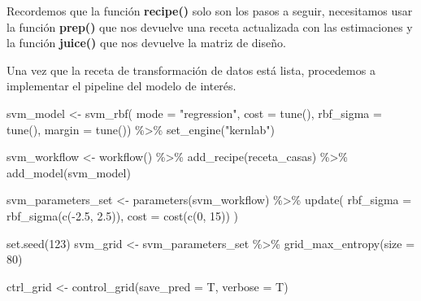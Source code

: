\documentclass[
]{book}
\newenvironment{Shaded}{\begin{snugshade}}{\end{snugshade}}
\newcommand{\AttributeTok}[1]{\textcolor[rgb]{0.77,0.63,0.00}{#1}}
\newcommand{\DecValTok}[1]{\textcolor[rgb]{0.00,0.00,0.81}{#1}}
\newcommand{\FloatTok}[1]{\textcolor[rgb]{0.00,0.00,0.81}{#1}}
\newcommand{\FunctionTok}[1]{\textcolor[rgb]{0.00,0.00,0.00}{#1}}
\newcommand{\NormalTok}[1]{#1}
\newcommand{\OtherTok}[1]{\textcolor[rgb]{0.56,0.35,0.01}{#1}}
\newcommand{\SpecialCharTok}[1]{\textcolor[rgb]{0.00,0.00,0.00}{#1}}
\newcommand{\StringTok}[1]{\textcolor[rgb]{0.31,0.60,0.02}{#1}}
\begin{document}
Recordemos que la función \textbf{recipe()} solo son los pasos a seguir, necesitamos usar la función \textbf{prep()} que nos devuelve una receta actualizada con las estimaciones y la función \textbf{juice()} que nos devuelve la matriz de diseño.

Una vez que la receta de transformación de datos está lista, procedemos a implementar el pipeline del modelo de interés.

\begin{Shaded}
\begin{Highlighting}[]
\NormalTok{svm\_model }\OtherTok{\textless{}{-}} \FunctionTok{svm\_rbf}\NormalTok{(}
  \AttributeTok{mode =} \StringTok{"regression"}\NormalTok{,}
  \AttributeTok{cost =} \FunctionTok{tune}\NormalTok{(),}
  \AttributeTok{rbf\_sigma =} \FunctionTok{tune}\NormalTok{(),}
  \AttributeTok{margin =} \FunctionTok{tune}\NormalTok{()) }\SpecialCharTok{\%\textgreater{}\%} 
\FunctionTok{set\_engine}\NormalTok{(}\StringTok{"kernlab"}\NormalTok{)}

\NormalTok{svm\_workflow }\OtherTok{\textless{}{-}} \FunctionTok{workflow}\NormalTok{() }\SpecialCharTok{\%\textgreater{}\%} 
  \FunctionTok{add\_recipe}\NormalTok{(receta\_casas) }\SpecialCharTok{\%\textgreater{}\%} 
  \FunctionTok{add\_model}\NormalTok{(svm\_model)}

\NormalTok{svm\_parameters\_set }\OtherTok{\textless{}{-}} \FunctionTok{parameters}\NormalTok{(svm\_workflow) }\SpecialCharTok{\%\textgreater{}\%} 
  \FunctionTok{update}\NormalTok{(}
   \AttributeTok{rbf\_sigma =} \FunctionTok{rbf\_sigma}\NormalTok{(}\FunctionTok{c}\NormalTok{(}\SpecialCharTok{{-}}\FloatTok{2.5}\NormalTok{, }\FloatTok{2.5}\NormalTok{)), }
   \AttributeTok{cost =} \FunctionTok{cost}\NormalTok{(}\FunctionTok{c}\NormalTok{(}\DecValTok{0}\NormalTok{, }\DecValTok{15}\NormalTok{))}
\NormalTok{   )}

\FunctionTok{set.seed}\NormalTok{(}\DecValTok{123}\NormalTok{)}
\NormalTok{svm\_grid }\OtherTok{\textless{}{-}}\NormalTok{ svm\_parameters\_set }\SpecialCharTok{\%\textgreater{}\%} 
  \FunctionTok{grid\_max\_entropy}\NormalTok{(}\AttributeTok{size =} \DecValTok{80}\NormalTok{)}

\NormalTok{ctrl\_grid }\OtherTok{\textless{}{-}} \FunctionTok{control\_grid}\NormalTok{(}\AttributeTok{save\_pred =}\NormalTok{ T, }\AttributeTok{verbose =}\NormalTok{ T)}
\end{Highlighting}
\end{Shaded}
\end{document}
